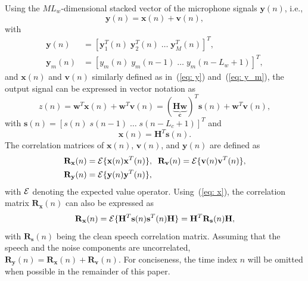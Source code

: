 \documentclass[draftcls,onecolumn,11pt]{IEEEtran}
\begin{document}
Using the $ML_w$-dimensional stacked vector of the microphone signals $\mathbf{y}(n)$, i.e.,
\begin{equation}
\mathbf{y}(n) = \mathbf{x}(n) + \mathbf{v}(n), 
\end{equation}
with
\begin{align}
  \label{eq: y}
  \mathbf{y}(n) &= [\mathbf{y}^T_1(n) \; \mathbf{y}^T_2(n) \; \ldots \; \mathbf{y}^T_M(n)]^T, \\
  \label{eq: y_m}
  \mathbf{y}_m(n) &= [y_m(n) \; y_m(n-1) \; \ldots \; y_m(n-L_w+1)]^T,
\end{align}
and $\mathbf{x}(n)$ and $\mathbf{v}(n)$ similarly defined as in~(\ref{eq: y}) and~(\ref{eq: y_m}), the output signal can be expressed in vector notation as
\begin{equation}
z(n) =  \mathbf{w}^T \mathbf{x}(n) + \mathbf{w}^T \mathbf{v}(n) =  (\underbrace{\mathbf{H}\mathbf{w}}_{\mathbf{c}})^T \mathbf{s}(n) + \mathbf{w}^T \mathbf{v}(n),
\end{equation}
with $\mathbf{s}(n) = [s(n) \; s(n-1) \; \ldots \; s(n-L_c+1)]^T$ and 
\begin{equation}
\label{eq: x}
\mathbf{x}(n) = \mathbf{H}^T\mathbf{s}(n).
\end{equation}
The correlation matrices of $\mathbf{x}(n)$, $\mathbf{v}(n)$, and $\mathbf{y}(n)$ are defined as
\begin{align}
\mathbf{R}_{\mathbf{x}}(n) & = {\cal{E}} \{\mathbf{x}(n)\mathbf{x}^T(n) \}, \; \; \mathbf{R}_{\mathbf{v}}(n) = {\cal{E}} \{\mathbf{v}(n)\mathbf{v}^T(n) \}, \\
\mathbf{R}_{\mathbf{y}}(n) &= {\cal{E}} \{\mathbf{y}(n)\mathbf{y}^T(n)\},  
\end{align}
with ${\cal{E}}$ denoting the expected value operator.
Using~(\ref{eq: x}), the correlation matrix $\mathbf{R}_{\mathbf{x}}(n)$ can also be expressed as
\begin{equation}
\label{eq: rxs}
\mathbf{R}_{\mathbf{x}}(n) = {\cal{E}} \{\mathbf{H}^T\mathbf{s}(n)\mathbf{s}^T(n)\mathbf{H} \} =  \mathbf{H}^T\mathbf{R}_{\mathbf{s}}(n)\mathbf{H},
\end{equation}
with $\mathbf{R}_{\mathbf{s}}(n)$ being the clean speech correlation matrix.
Assuming that the speech and the noise components are uncorrelated, $\mathbf{R}_{\mathbf{y}}(n) = \mathbf{R}_{\mathbf{x}}(n) + \mathbf{R}_{\mathbf{v}}(n)$.
For conciseness, the time index $n$ will be omitted when possible in the remainder of this paper.
\end{document}
